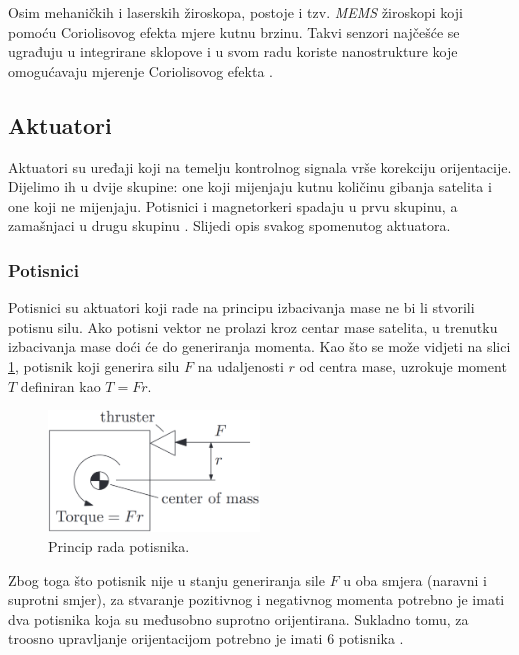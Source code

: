 \documentclass[times, utf8, diplomski, numeric]{templates/template}
\begin{document}
{{{            Osim mehaničkih i laserskih žiroskopa, postoje i tzv. \emph{MEMS} žiroskopi koji pomoću Coriolisovog efekta mjere kutnu brzinu. Takvi senzori najčešće se ugrađuju u integrirane sklopove i u svom radu koriste nanostrukture koje omogućavaju mjerenje Coriolisovog efekta \cite{memsGyro}.
        }

        \subsection{Aktuatori}{
            Aktuatori su uređaji koji na temelju kontrolnog signala vrše korekciju orijentacije. Dijelimo ih u dvije skupine: one koji mijenjaju kutnu količinu gibanja satelita i one koji ne mijenjaju. Potisnici i magnetorkeri spadaju u prvu skupinu, a zamašnjaci u drugu skupinu \cite{adcsKnjiga}. Slijedi opis svakog spomenutog aktuatora. 

            \subsubsection{Potisnici }{
                Potisnici su aktuatori koji rade na principu izbacivanja mase ne bi li stvorili potisnu silu. Ako potisni vektor ne prolazi kroz centar mase satelita, u trenutku izbacivanja mase doći će do generiranja momenta. Kao što se može vidjeti na slici \ref{fig:thruster_img}, potisnik koji generira silu $F$ na udaljenosti $r$ od centra mase, uzrokuje moment $T$ definiran kao $T=Fr$.

                \begin{figure}[htb]
                \centering
                \includegraphics[width=0.5\textwidth]{images/thruster_img.png}
                \caption{Princip rada potisnika.}
                \label{fig:thruster_img}
                \end{figure}

                Zbog toga što potisnik nije u stanju generiranja sile $F$ u oba smjera (naravni i suprotni smjer), za stvaranje pozitivnog i negativnog momenta potrebno je imati dva potisnika koja su međusobno suprotno orijentirana. Sukladno tomu, za troosno upravljanje orijentacijom potrebno je imati 6 potisnika \cite{adcsKnjiga}.
            }

}}}
\end{document}
